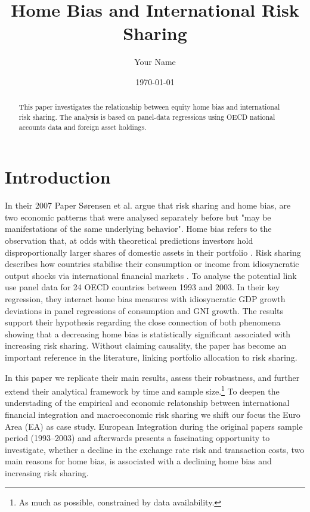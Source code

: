 \documentclass[12pt,a4paper]{article}
\title{Home Bias and International Risk Sharing}
\author{Your Name}
\date{\today}
\begin{document}
\maketitle

\begin{abstract}
This paper investigates the relationship between equity home bias and international risk sharing.
The analysis is based on panel-data regressions using OECD national accounts data and foreign asset holdings.
\end{abstract}

\newpage

\tableofcontents

\newpage

\section{Introduction}

In their 2007 Paper Sørensen et al. argue that risk sharing and home bias, are two economic patterns 
that were analysed separately before but "may be manifestations of the same underlying
behavior". Home bias refers to the observation that, at odds with theoretical predictions investors hold disproportionally larger shares of domestic assets in their portfolio \cite{French and Poterba}.
Risk sharing describes how countries stabilise their consumption or income from idiosyncratic output shocks via international financial markets \cite{Obstfeld 1994}.
To analyse the potential link \textcite{main} use panel data for 24 OECD countries between 1993 and 2003. In their key regression,
they interact home bias measures with idiosyncratic GDP growth deviations in panel regressions of consumption and GNI growth. The results support their
hypothesis regarding the close connection of both phenomena showing that a decreasing home bias is statistically significant associated with increasing risk sharing.
Without claiming causality, the paper has become an important reference in the literature, linking portfolio allocation to risk sharing. 

In this paper we replicate their main results, assess their robustness, and further extend their analytical framework by time and sample size.\footnote{As much as possible,
constrained by data availability.} To deepen the understading of the empirical and economic relatonship between international financial integration
and macroeconomic risk sharing we shift our focus the Euro Area (EA) as case study. European Integration during the original papers sample period (1993--2003) 
and afterwards presents a fascinating opportunity to investigate, whether a decline in the exchange rate risk and 
transaction costs, two main reasons for home bias, is associated with a declining home bias and increasing risk sharing. 
\end{document}
